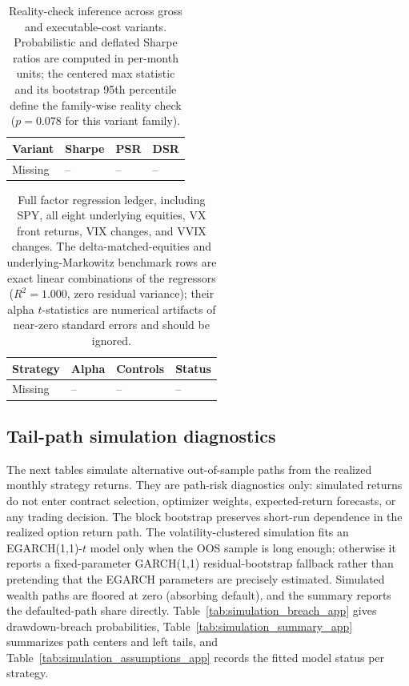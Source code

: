 \begin{table}[H]
\centering
\scriptsize
{}
  {\resizebox{\textwidth}{!}{}}
  {\begin{tabular}{llll}\toprule Variant & Sharpe & PSR & DSR \\\midrule Missing & -- & -- & -- \\\bottomrule\end{tabular}}
\caption{Reality-check inference across gross and executable-cost variants. Probabilistic
and deflated Sharpe ratios are computed in per-month units; the centered max statistic and
its bootstrap 95th percentile define the family-wise reality check (\(p=0.078\) for this
variant family).}
\label{tab:reality_check_app}
\end{table}

\begin{table}[H]
\centering
\scriptsize
{}
  {\resizebox{\textwidth}{!}{}}
  {\begin{tabular}{llll}\toprule Strategy & Alpha & Controls & Status \\\midrule Missing & -- & -- & -- \\\bottomrule\end{tabular}}
\caption{Full factor regression ledger, including SPY, all eight underlying equities, VX
front returns, VIX changes, and VVIX changes. The delta-matched-equities and
underlying-Markowitz benchmark rows are exact linear combinations of the regressors
(\(R^2=1.000\), zero residual variance); their alpha \(t\)-statistics are numerical
artifacts of near-zero standard errors and should be ignored.}
\label{tab:factor_regression_full_app}
\end{table}

\subsection{Tail-path simulation diagnostics}

The next tables simulate alternative out-of-sample paths from the realized monthly strategy
returns. They are path-risk diagnostics only: simulated returns do not enter contract
selection, optimizer weights, expected-return forecasts, or any trading decision. The block
bootstrap preserves short-run dependence in the realized option return path. The
volatility-clustered simulation fits an EGARCH(1,1)-\(t\) model \citep{nelson1991} only
when the OOS sample is long enough; otherwise it reports a fixed-parameter GARCH(1,1)
residual-bootstrap fallback rather than pretending that the EGARCH parameters are precisely
estimated. Simulated wealth paths
are floored at zero (absorbing default), and the summary reports the defaulted-path share
directly. Table~\ref{tab:simulation_breach_app} gives drawdown-breach probabilities,
Table~\ref{tab:simulation_summary_app} summarizes path centers and left tails, and
Table~\ref{tab:simulation_assumptions_app} records the fitted model status per strategy.

